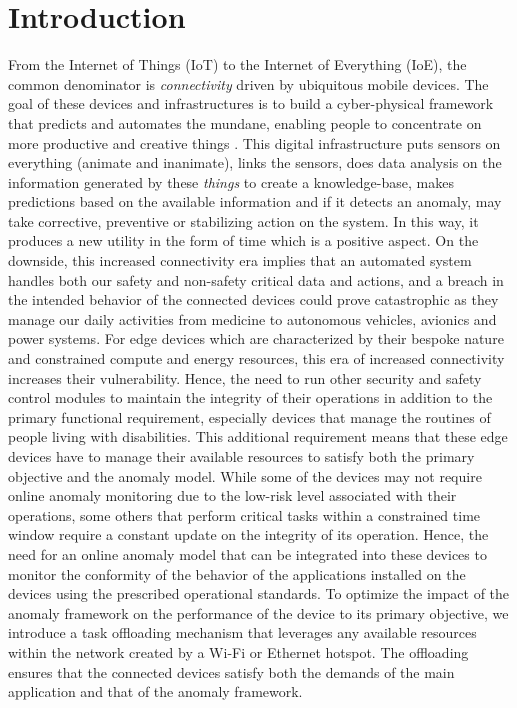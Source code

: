 \section{Introduction}
\label{sec:introduction}
From the Internet of Things (IoT) to the Internet of 
Everything (IoE), the 
common denominator is \emph{connectivity} driven by 
ubiquitous mobile devices. The goal of these devices and 
infrastructures is to 
build a 
cyber-physical framework that predicts and automates the 
mundane, enabling 
people to concentrate on more productive and creative things 
\cite{weldon2016future}. This digital infrastructure puts 
sensors on everything 
(animate and inanimate), links the sensors, does data 
analysis on the 
information generated by these \emph{things} to create a 
knowledge-base, makes 
predictions based on the available information and if it 
detects an anomaly, 
may take corrective, preventive or stabilizing action on the 
system. In this way, it produces a new utility 
in the form of 
time which is a positive aspect. On the downside, this 
increased connectivity 
era implies that an automated system handles both our safety 
and non-safety 
critical data and actions, and a breach in the intended 
behavior of the 
connected devices could prove catastrophic as they manage our 
daily activities 
from medicine to autonomous vehicles, avionics and power 
systems. For edge devices which are characterized by their bespoke nature and constrained compute and energy resources, this era of increased connectivity increases their vulnerability. Hence, the need to run other security and safety control modules to maintain the integrity of their operations in addition to the primary functional requirement, especially devices that manage the routines of people living with disabilities. This additional requirement 
means that these edge devices have to manage their available 
resources to satisfy both the primary objective and the 
anomaly model. While some of the devices may not require 
online anomaly monitoring due to the low-risk level 
associated with their operations, some others that perform 
critical tasks within a constrained time window require a 
constant update on the integrity of its operation. Hence, the 
need for an online anomaly model that can be integrated into 
these devices to monitor the conformity of the behavior of 
the applications installed on the devices using the 
prescribed operational standards. To optimize the impact of the anomaly framework on the performance of the device to its primary objective, we introduce a task offloading mechanism that leverages any available resources within the network created by a Wi-Fi or Ethernet hotspot. The offloading ensures that the connected devices satisfy both the demands of the main application and that of the anomaly framework. 
